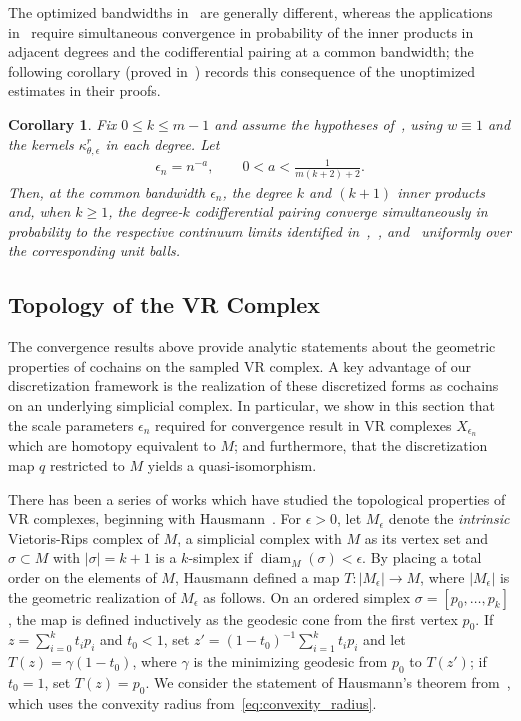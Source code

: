 \documentclass[11pt,reqno]{amsproc}
\numberwithin{equation}{section}
\newcommand{\diam}{\operatorname{diam}}
\newtheorem{corollary}[counter]{Corollary}
\theoremstyle{definition}
\theoremstyle{plain}
\begin{document}
    The optimized bandwidths in~ are generally different, whereas the applications in~ require simultaneous convergence in probability of the inner products in adjacent degrees and the codifferential pairing at a common bandwidth; the following corollary (proved in~) records this consequence of the unoptimized estimates in their proofs.

    \begin{corollary} \label{cor:common_bandwidth_convergence}
        Fix $0\leq k\leq m-1$ and assume the hypotheses of~, using $w\equiv1$ and the kernels $\kappa^r_{\theta,\epsilon}$ in each degree. Let
        \begin{align}
            \epsilon_n=n^{-a}, \qquad 0<a<\frac{1}{m(k+2)+2}.
        \end{align}
        Then, at the common bandwidth $\epsilon_n$, the degree $k$ and $(k+1)$ inner products and, when $k\geq1$, the degree-$k$ codifferential pairing converge simultaneously in probability to the respective continuum limits identified in~,~, and~ uniformly over the corresponding unit balls.
    \end{corollary}



    \subsection{Topology of the VR Complex} \label{ssec:rips_topology}

    The convergence results above provide analytic statements about the geometric properties of cochains on the sampled VR complex. A key advantage of our discretization framework is the realization of these discretized forms as cochains on an underlying simplicial complex. In particular, we show in this section that the scale parameters $\epsilon_n$ required for convergence result in VR complexes $X_{\epsilon_n}$ which are homotopy equivalent to $M$; and furthermore, that the discretization map $q$ restricted to $M$ yields a quasi-isomorphism. 

    There has been a series of works which have studied the topological properties of VR complexes, beginning with Hausmann~\cite{hausmann1995vietorisrips}. For $\epsilon > 0$, let $M_\epsilon$ denote the \emph{intrinsic} Vietoris-Rips complex of $M$, a simplicial complex with $M$ as its vertex set and $\sigma \subset M$ with $|\sigma| = k+1$ is a $k$-simplex if $\diam_M(\sigma) < \epsilon$. By placing a total order on the elements of $M$, Hausmann defined a map $T: |M_\epsilon| \to M$, where $|M_\epsilon|$ is the geometric realization of $M_\epsilon$ as follows. On an ordered simplex $\sigma=[p_0,\ldots,p_k]$, the map is defined inductively as the geodesic cone from the first vertex $p_0$. If $z=\sum_{i=0}^k t_i p_i$ and $t_0<1$, set $z'=(1-t_0)^{-1}\sum_{i=1}^k t_i p_i$ and let $T(z)=\gamma(1-t_0)$, where $\gamma$ is the minimizing geodesic from $p_0$ to $T(z')$; if $t_0=1$, set $T(z)=p_0$. We consider the statement of Hausmann's theorem from~\cite[Theorem 4]{majhi_demystifying_2024}, which uses the convexity radius from~\eqref{eq:convexity_radius}.
    
\end{document}

